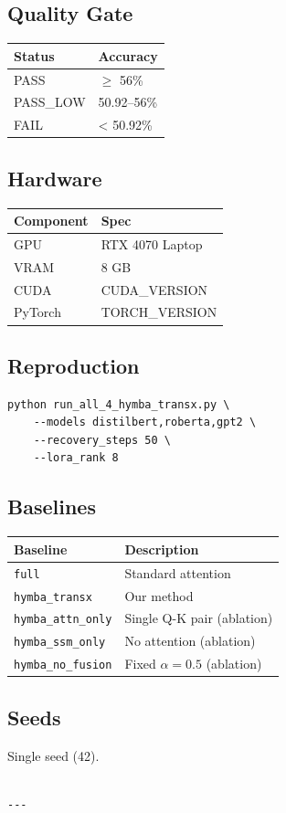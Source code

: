 \subsection{Quality Gate}

\begin{table}[H]
\centering
\small
\begin{tabular}{ll}
\toprule
\textbf{Status} & \textbf{Accuracy} \\
\midrule
PASS & $\ge$ 56\% \\
PASS\_LOW & 50.92--56\% \\
FAIL & < 50.92\% \\
\bottomrule
\end{tabular}
\end{table}

\subsection{Hardware}

\begin{table}[H]
\centering
\small
\begin{tabular}{ll}
\toprule
\textbf{Component} & \textbf{Spec} \\
\midrule
GPU & RTX 4070 Laptop \\
VRAM & 8 GB \\
CUDA & {{CUDA\_VERSION}} \\
PyTorch & {{TORCH\_VERSION}} \\
\bottomrule
\end{tabular}
\end{table}

\subsection{Reproduction}

\begin{lstlisting}
python run_all_4_hymba_transx.py \
    --models distilbert,roberta,gpt2 \
    --recovery_steps 50 \
    --lora_rank 8
\end{lstlisting}

\subsection{Baselines}

\begin{table}[H]
\centering
\small
\begin{tabular}{ll}
\toprule
\textbf{Baseline} & \textbf{Description} \\
\midrule
\texttt{full} & Standard attention \\
\texttt{hymba\_transx} & Our method \\
\texttt{hymba\_attn\_only} & Single Q-K pair (ablation) \\
\texttt{hymba\_ssm\_only} & No attention (ablation) \\
\texttt{hymba\_no\_fusion} & Fixed $\alpha = 0.5$ (ablation) \\
\bottomrule
\end{tabular}
\end{table}

\subsection{Seeds}

Single seed (42).
\begin{lstlisting}

---
\end{lstlisting}